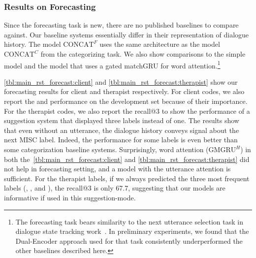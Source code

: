 \subsubsection{Results on Forecasting}
\label{sssec:snt:results-forecasting}
Since the forecasting task is new, there are no published baselines to
compare against. Our baseline systems essentially differ in their
representation of dialogue history. The model $\text{CONCAT}^{F}$ uses
the same architecture as the model $\text{CONCAT}^{C}$ from the
categorizing task. We also show comparisons to the simple \HGRU model
and the \GMGRUH model that uses a gated matchGRU for word
attention.\footnote{The forecasting task bears similarity to the next
  utterance selection task in dialogue state tracking
  work~\cite{DSTC7}. In preliminary experiments, we found that the
  Dual-Encoder approach used for that task consistently underperformed
  the other baselines described here.}

\autoref{tbl:main_rst_forecast:client} and
\autoref{tbl:main_rst_forecast:therapist} show our forecasting results
for client and therapist respectively. For client codes, we also
report the \CHANGE and \SUSTAIN performance on the development set
because of their importance.  For the therapist codes, we also report
the recall@3 to show the performance of a suggestion system that
displayed three labels instead of one.
%
The results show that even without an utterance, the dialogue history
conveys signal about the next MISC label. Indeed, the performance for
some labels is even better than some categorization baseline
systems. Surprisingly, word attention ($\text{GMGRU}^{H}$) in both
the~\autoref{tbl:main_rst_forecast:client} and
\autoref{tbl:main_rst_forecast:therapist} did not help in forecasting
setting, and a model with the \self utterance attention is
sufficient. For the therapist labels, if we always predicted the three
most frequent labels (\FA, \GI, and \RES), the recall@3 is only 67.7,
suggesting that our models are informative if used in this
suggestion-mode.

